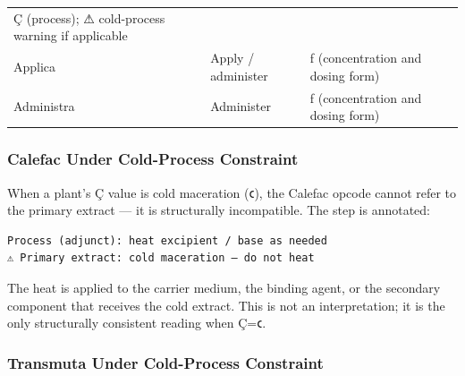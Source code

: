 \begin{longtable}[]{@{}lll@{}}
\begin{minipage}[t]{0.30\columnwidth}
Ç (process); ⚠ cold-process warning if applicable\strut
\end{minipage}\tabularnewline
\begin{minipage}[t]{0.30\columnwidth}\raggedright
Applica\strut
\end{minipage} & \begin{minipage}[t]{0.30\columnwidth}\raggedright
Apply / administer\strut
\end{minipage} & \begin{minipage}[t]{0.30\columnwidth}\raggedright
ƒ (concentration and dosing form)\strut
\end{minipage}\tabularnewline
\begin{minipage}[t]{0.30\columnwidth}\raggedright
Administra\strut
\end{minipage} & \begin{minipage}[t]{0.30\columnwidth}\raggedright
Administer\strut
\end{minipage} & \begin{minipage}[t]{0.30\columnwidth}\raggedright
ƒ (concentration and dosing form)\strut
\end{minipage}\tabularnewline
\bottomrule
\end{longtable}

\hypertarget{calefac-under-cold-process-constraint}{%
\subsubsection{Calefac Under Cold-Process
Constraint}\label{calefac-under-cold-process-constraint}}

When a plant's Ç value is cold maceration (𐑤), the Calefac opcode cannot
refer to the primary extract --- it is structurally incompatible. The
step is annotated:

\begin{verbatim}
Process (adjunct): heat excipient / base as needed
⚠ Primary extract: cold maceration — do not heat
\end{verbatim}

The heat is applied to the carrier medium, the binding agent, or the
secondary component that receives the cold extract. This is not an
interpretation; it is the only structurally consistent reading when Ç=𐑤.

\hypertarget{transmuta-under-cold-process-constraint}{%
\subsubsection{Transmuta Under Cold-Process
Constraint}\label{transmuta-under-cold-process-constraint}}

